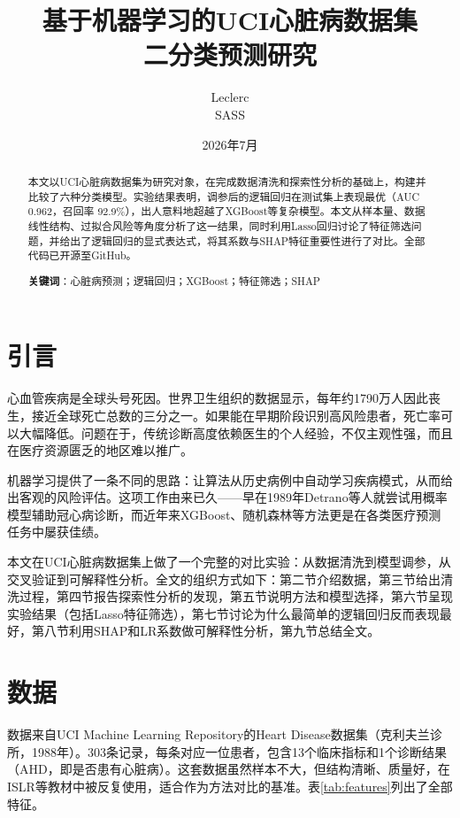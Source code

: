\documentclass[12pt,a4paper]{ctexart}
\title{\textbf{基于机器学习的UCI心脏病数据集\\二分类预测研究}}
\author{Leclerc \\ SASS}
\date{2026年7月}
\begin{document}
\maketitle

\begin{abstract}
\noindent 本文以UCI心脏病数据集为研究对象，在完成数据清洗和探索性分析的基础上，构建并比较了六种分类模型。实验结果表明，调参后的逻辑回归在测试集上表现最优（AUC 0.962，召回率 92.9\%），出人意料地超越了XGBoost等复杂模型。本文从样本量、数据线性结构、过拟合风险等角度分析了这一结果，同时利用Lasso回归讨论了特征筛选问题，并给出了逻辑回归的显式表达式，将其系数与SHAP特征重要性进行了对比。全部代码已开源至GitHub。

\vspace{1em}
\noindent\textbf{关键词}：心脏病预测；逻辑回归；XGBoost；特征筛选；SHAP
\end{abstract}

\tableofcontents
\newpage

\section{引言}

心血管疾病是全球头号死因。世界卫生组织的数据显示，每年约1790万人因此丧生，接近全球死亡总数的三分之一。如果能在早期阶段识别高风险患者，死亡率可以大幅降低。问题在于，传统诊断高度依赖医生的个人经验，不仅主观性强，而且在医疗资源匮乏的地区难以推广。

机器学习提供了一条不同的思路：让算法从历史病例中自动学习疾病模式，从而给出客观的风险评估。这项工作由来已久——早在1989年Detrano等人就尝试用概率模型辅助冠心病诊断\cite{detrano}，而近年来XGBoost、随机森林等方法更是在各类医疗预测任务中屡获佳绩。

本文在UCI心脏病数据集上做了一个完整的对比实验：从数据清洗到模型调参，从交叉验证到可解释性分析。全文的组织方式如下：第二节介绍数据，第三节给出清洗过程，第四节报告探索性分析的发现，第五节说明方法和模型选择，第六节呈现实验结果（包括Lasso特征筛选），第七节讨论为什么最简单的逻辑回归反而表现最好，第八节利用SHAP和LR系数做可解释性分析，第九节总结全文。

\section{数据}

数据来自UCI Machine Learning Repository的Heart Disease数据集（克利夫兰诊所，1988年）。303条记录，每条对应一位患者，包含13个临床指标和1个诊断结果（AHD，即是否患有心脏病）。这套数据虽然样本不大，但结构清晰、质量好，在ISLR等教材中被反复使用，适合作为方法对比的基准。表\ref{tab:features}列出了全部特征。
\end{document}
